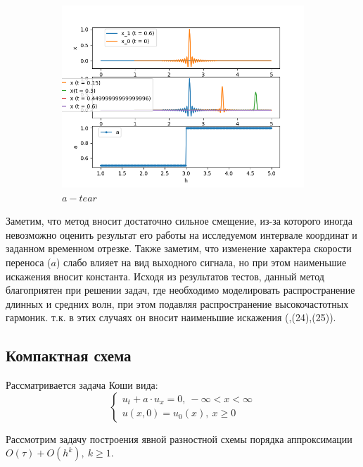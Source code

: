 \documentclass{article}
\begin{document}
\begin{figure}[h]
\begin{subfigure}{0.33\textwidth}
    {\includegraphics[width=1\linewidth]{tests_bcomp/a_tear_x0_peak.png} \\$a - tear$}
    \end{subfigure}
\end{figure}
\newpage
Заметим, что метод вносит достаточно сильное смещение, из-за которого иногда невозможно оценить результат его работы на исследуемом интервале координат и заданном временном отрезке. Также заметим, что изменение характера скорости переноса ($a$) слабо влияет на вид выходного сигнала, но при этом наименьшие искажения вносит константа.
Исходя из результатов тестов, данный метод благоприятен при решении задач, где необходимо моделировать распространение длинных и средних волн, при этом подавляя распространение высокочастотных гармоник. т.к. в этих случаях он вносит наименьшие искажения (\cite{bcomp},(24),(25)).


\subsection{Компактная схема}

Рассматривается задача Коши вида:
$$  \left\{
        \begin{array}{l}
            u_t + a \cdot u_x = 0, \: -\infty < x < \infty \\
            u(x,0) = u_0(x), \: x \ge 0
        \end{array}
    \right. $$

Рассмотрим задачу построения явной разностной схемы порядка аппроксимации $O(\tau) + O(h^k), \: k \ge 1$.
\end{document}
